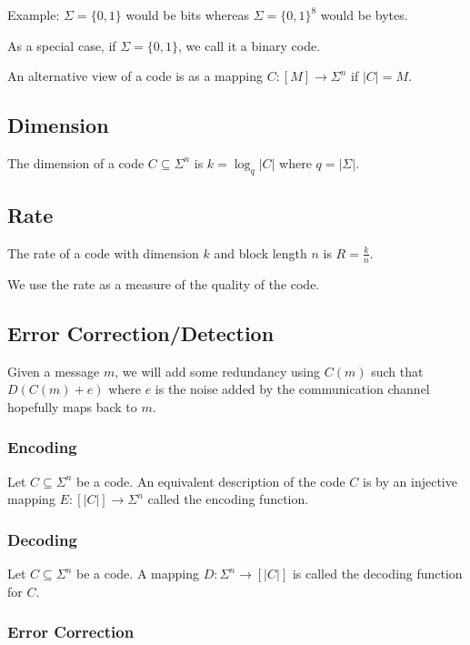 \documentclass{idc_msc}
\begin{document}
Example: $\Sigma = \{0,1\}$ would be bits whereas $\Sigma = \{0,1\}^8$ would be bytes.

As a special case, if $\Sigma = \{0,1\}$, we call it a binary code.

An alternative view of a code is as a mapping $C : [M] \to \Sigma^n$ if $|C| = M$.

\subsection{Dimension}

The dimension of a code $C \subseteq \Sigma^n$ is $k = \log_q{|C|}$ where $q=|\Sigma|$.

\subsection{Rate}

The rate of a code with dimension $k$ and block length $n$ is $R = \frac{k}{n}$.

We use the rate as a measure of the quality of the code.

\subsection{Error Correction/Detection}

Given a message $m$, we will add some redundancy using $C(m)$ such that $D(C(m) + e)$ where $e$ is the noise added by the communication channel hopefully maps back to $m$.

\subsubsection{Encoding}

Let $C \subseteq \Sigma^n$ be a code. An equivalent description of the code $C$ is by an injective mapping $E : [|C|] \to \Sigma^n$ called the encoding function.

\subsubsection{Decoding}

Let $C \subseteq \Sigma^n$ be a code. A mapping $D : \Sigma^n \to [|C|]$ is called the decoding function for $C$.

\subsubsection{Error Correction}
\end{document}
